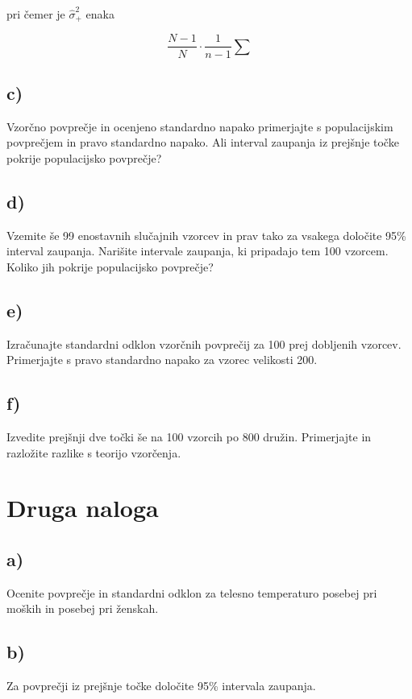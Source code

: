 \documentclass[12pt, a4paper]{article}
\begin{document}
pri čemer je $\hat{\sigma}_+^2$ enaka 

$$ \frac{N-1}{N} \cdot \frac{1}{n-1} \sum  $$

\subsection{c)}
Vzorčno povprečje in ocenjeno standardno napako primerjajte s populacijskim
povprečjem in pravo standardno napako. Ali interval zaupanja iz prejšnje točke
pokrije populacijsko povprečje?

\subsection{d)}
Vzemite še 99 enostavnih slučajnih vzorcev in prav tako za vsakega določite
95\% interval zaupanja. Narišite intervale zaupanja, ki pripadajo tem 100 
vzorcem. Koliko jih pokrije populacijsko povprečje?

\subsection{e)}
Izračunajte standardni odklon vzorčnih povprečij za 100 prej dobljenih 
vzorcev. Primerjajte s pravo standardno napako za vzorec velikosti 200.

\subsection{f)}
Izvedite prejšnji dve točki še na 100 vzorcih po 800 družin. Primerjajte 
in razložite razlike s teorijo vzorčenja.



\section{Druga naloga}

\subsection{a)}
Ocenite povprečje in standardni odklon za telesno temperaturo posebej pri
moških in posebej pri ženskah.

\subsection{b)}
Za povprečji iz prejšnje točke določite 95\% intervala zaupanja.
\end{document}
